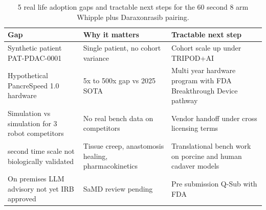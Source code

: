 \begin{table}[H]
\caption{5 real life adoption gaps and tractable next steps for the 60 second 8 arm Whipple plus Daraxonrasib pairing.}
\label{tab:discussion-realworld}
\centering
\begin{tabular}{>{\raggedright\arraybackslash}p{4.0cm} >{\raggedright\arraybackslash}p{4.6cm} >{\raggedright\arraybackslash}p{4.6cm}}
\toprule
\textbf{Gap} & \textbf{Why it matters} & \textbf{Tractable next step} \\
\midrule
  Synthetic patient PAT-PDAC-0001 & Single patient, no cohort variance & Cohort scale up under TRIPOD+AI \cite{Collins2024TRIPODAI} \\
  Hypothetical PancreSpeed 1.0 hardware & 5x to 500x gap vs 2025 SOTA & Multi year hardware program with FDA Breakthrough Device pathway \\
  Simulation vs simulation for 3 robot competitors & No real bench data on competitors & Vendor handoff under cross licensing terms \\
  60 second time scale not biologically validated & Tissue creep, anastomosis healing, pharmacokinetics & Translational bench work on porcine and human cadaver models \\
  On premises LLM advisory not yet IRB approved & SaMD review pending & Pre submission Q-Sub with FDA \cite{fda-samd} \\
\bottomrule
\end{tabular}
\end{table}
